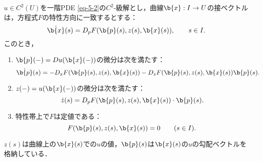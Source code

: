 \documentclass[uplatex,dvipdfmx]{jsreport}
\begin{document}
\begin{theorem}\label{thm-structure-of-characteristic-curve}
    $u\in C^2(U)$を一階PDE \ref{eq-5-2}の$C^2$-級解とし，曲線$\b{x}:I\to U$の接ベクトルは，方程式$F$の特性方向に一致するとする：
    \[\dot{\b{x}}(s)=D_pF(\b{p}(s),z(s),\b{x}(s)),\qquad s\in I.\]
    このとき，
    \begin{enumerate}
        \item $\b{p}(-)=Du(\b{x}(-))$の微分は次を満たす：
        \[\dot{\b{p}}(s)=-D_xF(\b{p}(s),z(s),\b{x}(s))-D_zF(\b{p}(s),z(s),\b{x}(s))\b{p}(s).\]
        \item $z(-)=u(\b{x}(-))$の微分は次を満たす：
        \[\dot{z}(s)=D_pF(\b{p}(s),z(s),\b{x}(s))\cdot\b{p}(s).\]
        \item 特性帯上で$F$は定値である：
        \[F(\b{p}(s),z(s),\b{x}(s))=0\qquad(s\in I).\]
    \end{enumerate}
\end{theorem}
\begin{remarks}[追加した特性曲線のパラメータの意味]
    $z(s)$は曲線上の$\b{x}(s)$での$u$の値，$\b{p}(s)$は$\b{x}(s)$の$u$の勾配ベクトルを格納している．
\end{remarks}
\end{document}
